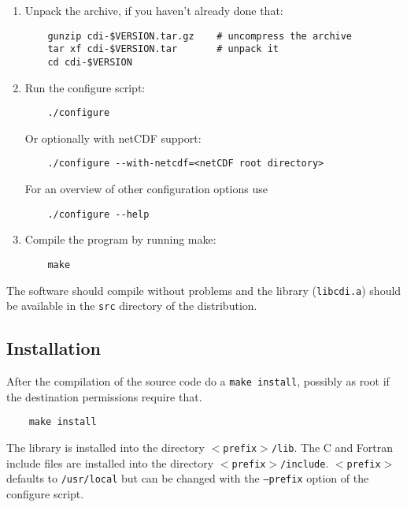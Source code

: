 \begin{enumerate}
\item Unpack the archive, if you haven't already done that:
   
\begin{verbatim}
    gunzip cdi-$VERSION.tar.gz    # uncompress the archive
    tar xf cdi-$VERSION.tar       # unpack it
    cd cdi-$VERSION
\end{verbatim}

\item Run the configure script:
 
\begin{verbatim}
    ./configure
\end{verbatim}

Or optionally with netCDF support:
 
\begin{verbatim}
    ./configure --with-netcdf=<netCDF root directory>
\end{verbatim}

For an overview of other configuration options use

\begin{verbatim}
    ./configure --help
\end{verbatim}

\item Compile the program by running make:

\begin{verbatim}
    make
\end{verbatim}

\end{enumerate}

The software should compile without problems and the {\CDI} library ({\tt libcdi.a}) 
should be available in the {\tt src} directory of the distribution.


\subsection{Installation}

After the compilation of the source code do a {\tt make install},
possibly as root if the destination permissions require that.

\begin{verbatim}
    make install
\end{verbatim} 

The library is installed into the directory {\tt $<$prefix$>$/lib}.
The C and Fortran include files are installed into the directory {\tt $<$prefix$>$/include}.
{\tt $<$prefix$>$} defaults to {\tt /usr/local} but can be changed with 
the {\tt --prefix} option of the configure script. 



